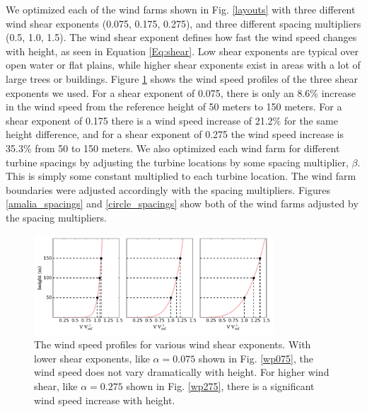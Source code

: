We optimized each of the wind farms shown in Fig. \ref{layouts} with three different wind shear exponents (0.075, 0.175, 0.275), and three different spacing multipliers (0.5, 1.0, 1.5). The wind shear exponent defines how fast the wind speed changes with height, as seen in Equation \ref{Eq:shear}. Low shear exponents are typical over open water or flat plains, while higher shear exponents exist in areas with a lot of large trees or buildings. Figure \ref{shear_profile} shows the wind speed profiles of the three shear exponents we used. For a shear exponent of 0.075, there is only an 8.6\% increase in the wind speed from the reference height of 50 meters to 150 meters. For a shear exponent of 0.175 there is a wind speed increase of 21.2\% for the same height difference, and for a shear exponent of 0.275 the wind speed increase is 35.3\% from 50 to 150 meters. We also optimized each wind farm for different turbine spacings by adjusting the turbine locations by some spacing multiplier, $\beta$.  This is simply some constant multiplied to each turbine location. The wind farm boundaries were adjusted accordingly with the spacing multipliers. Figures \ref{amalia_spacings} and \ref{circle_spacings} show both of the wind farms adjusted by the spacing multipliers.


\begin{figure}[htbp]
  \centering
  \includegraphics[width=0.8\textwidth]{Figures/shears.pdf}
  \caption{\label{shear_profile}The wind speed profiles for various wind shear exponents. With lower shear exponents, like $\alpha=0.075$ shown in Fig. \ref{wp075}, the wind speed does not vary dramatically with height. For higher wind shear, like $\alpha=0.275$ shown in Fig. \ref{wp275}, there is a significant wind speed increase with height.}
\end{figure}

